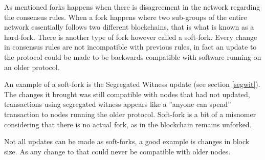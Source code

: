 \label{soft_hard_fork}
As mentioned forks happens when there is disagreement in the network regarding the consensus rules. When a fork happens where two sub-groups of the entire network essentially follows two different blockchains, that is what is known as a hard-fork. There is another type of fork however called a soft-fork.  Every change in consensus rules are not incompatible with previous rules, in fact an update to the protocol could be made to be backwards compatible with software running on an older protocol.\cite{antonopoulos_2017}

An example of a soft-fork is the Segregated Witness update (see section \ref{segwit}). The changes it brought was still compatible with nodes that had not updated, transactions using segregated witness appears like a ''anyone can spend'' transaction to nodes running the older protocol. Soft-fork is a bit of a misnomer considering that there is no actual fork, as in the blockchain remains unforked.\cite{antonopoulos_2017}

Not all updates can be made as soft-forks, a good example is changes in block size. As any change to that could never be compatible with older nodes.
